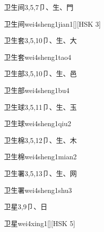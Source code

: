 \begin{Entry}{卫生间}{3,5,7}{⼙、⽣、⾨}
  \begin{Phonetics}{卫生间}{wei4sheng1jian1}[][HSK 3]
  \end{Phonetics}
\end{Entry}

\begin{Entry}{卫生套}{3,5,10}{⼙、⽣、⼤}
  \begin{Phonetics}{卫生套}{wei4sheng1tao4}
  \end{Phonetics}
\end{Entry}

\begin{Entry}{卫生部}{3,5,10}{⼙、⽣、⾢}
  \begin{Phonetics}{卫生部}{wei4sheng1bu4}
  \end{Phonetics}
\end{Entry}

\begin{Entry}{卫生球}{3,5,11}{⼙、⽣、⽟}
  \begin{Phonetics}{卫生球}{wei4sheng1qiu2}
  \end{Phonetics}
\end{Entry}

\begin{Entry}{卫生棉}{3,5,12}{⼙、⽣、⽊}
  \begin{Phonetics}{卫生棉}{wei4sheng1mian2}
  \end{Phonetics}
\end{Entry}

\begin{Entry}{卫生署}{3,5,13}{⼙、⽣、⽹}
  \begin{Phonetics}{卫生署}{wei4sheng1shu3}
  \end{Phonetics}
\end{Entry}

\begin{Entry}{卫星}{3,9}{⼙、⽇}
  \begin{Phonetics}{卫星}{wei4xing1}[][HSK 5]
  \end{Phonetics}
\end{Entry}

